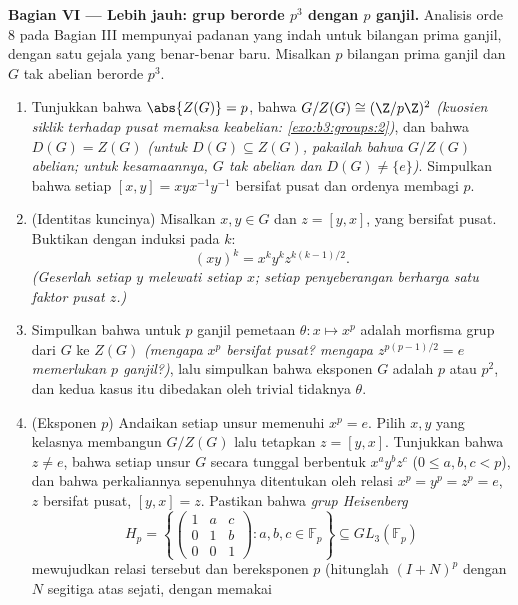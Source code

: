 \begin{problem}
\medskip
\noindent\textbf{Bagian VI --- Lebih jauh: grup berorde $p^3$ dengan
$p$ ganjil.} Analisis orde $8$ pada Bagian III mempunyai padanan
yang indah untuk bilangan prima ganjil, dengan satu gejala yang benar-benar baru. Misalkan $p$
bilangan prima ganjil dan $G$ tak abelian berorde $p^3$.
\begin{enumerate}[resume]
  \item Tunjukkan bahwa $\abs{Z(G)} = p$, bahwa $G/Z(G) \cong
        (\Z/p\Z)^2$ \emph{(kuosien siklik terhadap pusat memaksa
        keabelian: \cref{exo:b3:groups:2})}, dan bahwa $D(G) =
        Z(G)$ \emph{(untuk $D(G) \subseteq Z(G)$, pakailah bahwa
        $G/Z(G)$ abelian; untuk kesamaannya, $G$ tak abelian dan
        $D(G) \neq \{e\}$)}. Simpulkan bahwa setiap 
        $[x, y] = xyx^{-1}y^{-1}$ bersifat pusat dan ordenya
        membagi $p$.
  \item (Identitas kuncinya) Misalkan $x, y \in G$ dan $z = [y, x]$,
        yang bersifat pusat. Buktikan dengan induksi pada $k$:
        \[
        (xy)^k = x^k y^k z^{k(k-1)/2} .
        \]
        \emph{(Geserlah setiap $y$ melewati setiap $x$; setiap penyeberangan berharga
        satu faktor pusat $z$.)}
  \item Simpulkan bahwa untuk $p$ ganjil pemetaan $\theta\colon x \mapsto
        x^p$ adalah morfisma grup dari $G$ ke $Z(G)$ \emph{(mengapa
        $x^p$ bersifat pusat? mengapa $z^{p(p-1)/2} = e$ memerlukan $p$
        ganjil?)}, lalu simpulkan bahwa eksponen $G$ adalah $p$ atau $p^2$,
        dan kedua kasus itu dibedakan oleh trivial tidaknya $\theta$.
  \item (Eksponen $p$) Andaikan setiap unsur memenuhi $x^p = e$.
        Pilih $x, y$ yang kelasnya membangun $G/Z(G)$ lalu tetapkan $z =
        [y, x]$. Tunjukkan bahwa $z \neq e$, bahwa setiap unsur $G$
        secara tunggal berbentuk $x^ay^bz^c$ ($0 \leq a, b, c < p$), dan bahwa
        perkaliannya sepenuhnya ditentukan oleh
        relasi $x^p = y^p = z^p = e$, $z$ bersifat pusat, $[y, x] =
        z$. Pastikan bahwa \emph{grup Heisenberg}
        \[
        H_p = \left\{
        \begin{pmatrix} 1 & a & c\\ 0 & 1 & b\\ 0 & 0 & 1
        \end{pmatrix} : a, b, c \in \mathbb F_p \right\}
        \subseteq GL_3(\mathbb F_p)
        \]
        mewujudkan relasi tersebut dan bereksponen $p$ (hitunglah
        $(I + N)^p$ dengan $N$ segitiga atas sejati, dengan memakai

\end{enumerate}
\end{problem}
